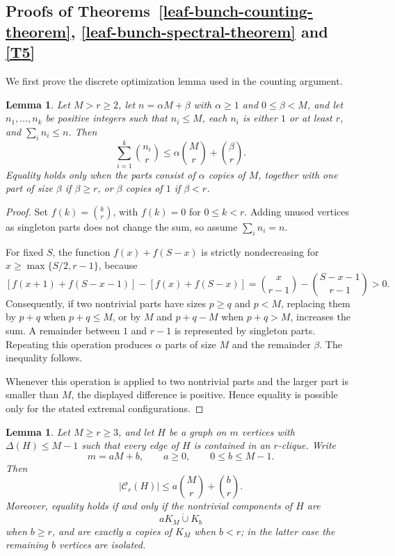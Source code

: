 \documentclass[11pt,a4paper]{article}
\newtheorem{lemma}[theorem]{Lemma}
\newcommand{\dunion}{\mathbin{\dot\cup}}
\begin{document}
\subsection{Proofs of Theorems~\ref{leaf-bunch-counting-theorem}, \ref{leaf-bunch-spectral-theorem} and  \ref{T5}}\label{counting-proof}

We first prove the discrete optimization lemma used in the counting argument.

\begin{lemma}\label{opt}
Let \(M>r\ge2\), let \(n=\alpha M+\beta\) with \(\alpha\ge1\) and \(0\le\beta<M\), and let \(n_1,\ldots,n_k\) be positive integers such that \(n_i\le M\), each \(n_i\) is either \(1\) or at least \(r\), and \(\sum_i n_i\le n\). Then
\[
\sum_{i=1}^k\binom{n_i}{r}\le \alpha\binom Mr+\binom\beta r.
\]
Equality holds only when the parts consist of \(\alpha\) copies of \(M\), together with one part of size \(\beta\) if \(\beta\ge r\), or \(\beta\) copies of $1$ if \(\beta<r\).
\end{lemma}

\begin{proof}
Set \(f(k)=\binom{k}{r}\), with \(f(k)=0\) for \(0\le k<r\). Adding unused vertices as singleton parts does not change the sum, so assume \(\sum_i n_i=n\).

For fixed \(S\), the function \(f(x)+f(S-x)\) is strictly nondecreasing for \(x\ge \max\{S/2,r-1\}\), because
\[
[f(x+1)+f(S-x-1)]-[f(x)+f(S-x)]
=\binom{x}{r-1}-\binom{S-x-1}{r-1}>0.
\]
Consequently, if two nontrivial parts have sizes \(p\ge q\) and \(p<M\), replacing them by \(p+q\) when \(p+q\le M\), or by \(M\) and \(p+q-M\) when \(p+q>M\), increases the sum. A remainder between \(1\) and \(r-1\) is represented by singleton parts. Repeating this operation produces \(\alpha\) parts of size \(M\) and the remainder \(\beta\). The inequality follows.

Whenever this operation is applied to two nontrivial parts and the larger part is smaller than \(M\), the displayed difference is positive. Hence equality is possible only for the stated extremal configurations.
\end{proof}

\begin{lemma}\label{bounded-degree-clique-equality}
Let $M\ge r\ge3$, and let $H$ be a graph on $m$ vertices with $\Delta(H)\le M-1$ such that every edge of $H$ is contained in an $r$-clique. Write
\[
m=aM+b,
\qquad a\ge0,
\qquad 0\le b\le M-1.
\]
Then
\[
|\mathcal C_r(H)|
\le a\binom Mr+\binom br.
\]
Moreover, equality holds if and only if the nontrivial components of $H$ are
\[
aK_M\dunion K_b
\]
when $b\ge r$, and are exactly $a$ copies of $K_M$ when $b<r$; in the latter case the remaining $b$ vertices are isolated.
\end{lemma}
\end{document}
